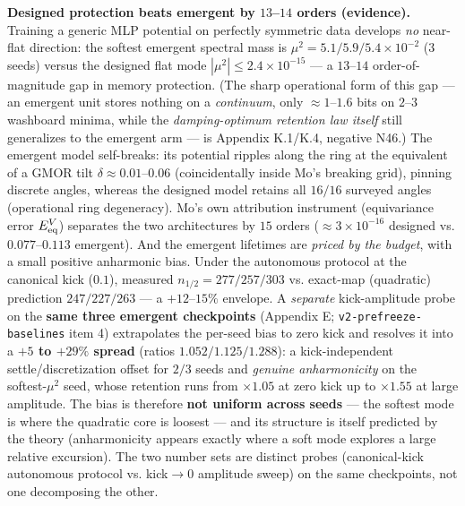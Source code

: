 \documentclass[10pt]{article}
\begin{document}
\textbf{Designed protection beats emergent by $13$--$14$ orders (evidence).} Training a generic MLP potential on perfectly symmetric data develops \emph{no} near-flat direction: the softest emergent spectral mass is $\mu^2=5.1/5.9/5.4\!\times\!10^{-2}$ ($3$ seeds) versus the designed flat mode $|\mu^2|\le2.4\!\times\!10^{-15}$ --- a $13$--$14$ order-of-magnitude gap in memory protection. (The sharp operational form of this gap --- an emergent unit stores nothing on a \emph{continuum}, only $\approx1$--$1.6$ bits on $2$--$3$ washboard minima, while the \emph{damping-optimum retention law itself} still generalizes to the emergent arm --- is Appendix K.1/K.4, negative N46.) The emergent model self-breaks: its potential ripples along the ring at the equivalent of a GMOR tilt $\delta\approx0.01$--$0.06$ (coincidentally inside Mo's breaking grid), pinning discrete angles, whereas the designed model retains all $16/16$ surveyed angles (operational ring degeneracy). Mo's own attribution instrument (equivariance error $E^V_{\rm eq}$) separates the two architectures by $15$ orders ($\approx3\!\times\!10^{-16}$ designed vs. $0.077$--$0.113$ emergent). And the emergent lifetimes are \emph{priced by the budget}, with a small positive anharmonic bias. Under the autonomous protocol at the canonical kick ($0.1$), measured $n_{1/2}=277/257/303$ vs. exact-map (quadratic) prediction $247/227/263$ --- a $+12$--$15\%$ envelope. A \emph{separate} kick-amplitude probe on the \textbf{same three emergent checkpoints} (Appendix E; \texttt{v2-prefreeze-baselines} item 4) extrapolates the per-seed bias to zero kick and resolves it into a \textbf{$+5$ to $+29\%$ spread} (ratios $1.052/1.125/1.288$): a kick-independent settle/discretization offset for $2/3$ seeds and \emph{genuine anharmonicity} on the softest-$\mu^2$ seed, whose retention runs from $\times1.05$ at zero kick up to $\times1.55$ at large amplitude. The bias is therefore \textbf{not uniform across seeds} --- the softest mode is where the quadratic core is loosest --- and its structure is itself predicted by the theory (anharmonicity appears exactly where a soft mode explores a large relative excursion). The two number sets are distinct probes (canonical-kick autonomous protocol vs. kick$\to0$ amplitude sweep) on the same checkpoints, not one decomposing the other.
\end{document}

